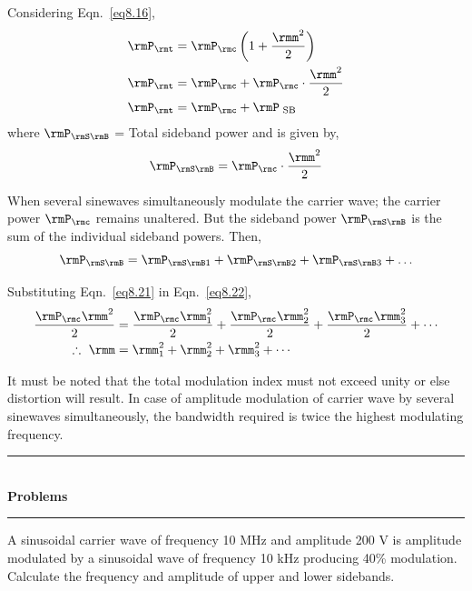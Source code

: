 \begin{method}%
Considering Eqn.~\eqref{eq8.16},
\begin{align}
\rmP_\rmt & = \rmP_\rmc \left(1+ \frac{\rmm^2}{2} \right)\notag\\
\rmP_\rmt & = \rmP_\rmc + \rmP_\rmc  \cdot \frac{\rmm^2}{2}\notag\\
\rmP_\rmt & = \rmP_\rmc + \rmP_{\text{ SB}} \label{eq8.20}
\end{align}
where $\rmP_{\rmS\rmB}$ = Total sideband power and is given by,
\begin{equation}
\rmP_{\rmS\rmB} = \rmP_\rmc \cdot \frac{\rmm^2}{2}\label{eq8.21}
\end{equation}

When several sinewaves simultaneously modulate the carrier wave; the
carrier power $\rmP_\rmc$ remains unaltered. But the sideband power $\rmP_{\rmS\rmB}$
is the sum of the individual sideband powers. Then,
\begin{equation}
\rmP_{\rmS\rmB} = \rmP_{\rmS\rmB1} + \rmP_{\rmS\rmB2} + \rmP_{\rmS\rmB3} + \ldots\label{eq8.22}
\end{equation}

Substituting Eqn.~\eqref{eq8.21} in Eqn.~\eqref{eq8.22},
\begin{align}
\frac{\rmP_\rmc \rmm^2}{2} & = \frac{\rmP_\rmc \rmm^2_1}{2} + \frac{\rmP_\rmc \rmm^2_2}{2}
+ \frac{\rmP_\rmc \rmm^2_3}{2} + \cdots \notag\\
\therefore ~ \rmm & = \rmm_1^2 + \rmm^2_2 + \rmm_3^2 + \cdots \label{eq8.23}
\end{align}

It must be noted that the total modulation index must not exceed unity
or else distortion will result. In case of amplitude modulation of
carrier wave by several sinewaves simultaneously, the bandwidth
required is twice the highest modulating frequency.
\end{method}

\begin{center}
\rule{4cm}{1pt}\\
{\bf\Large Problems}\\[-3pt]
\rule{4cm}{1pt}
\end{center}

\begin{problem}\label{prob8.1}
A sinusoidal carrier wave of frequency 10 MHz and amplitude 200 V is
amplitude modulated by a sinusoidal wave of frequency 10 kHz producing
40\% modulation. Calculate the frequency and amplitude of upper and
lower sidebands.
\end{problem}

